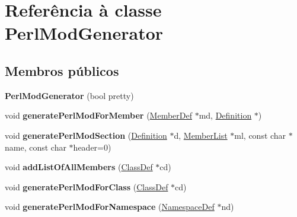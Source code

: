 \hypertarget{class_perl_mod_generator}{\section{Referência à classe Perl\-Mod\-Generator}
\label{class_perl_mod_generator}
}
\subsection*{Membros públicos}
\begin{DoxyCompactItemize}
\item 
\hypertarget{class_perl_mod_generator_a58f771e9e5431d52bbb7ca83eee515ba}{{\bfseries Perl\-Mod\-Generator} (bool pretty)}\label{class_perl_mod_generator_a58f771e9e5431d52bbb7ca83eee515ba}

\item 
\hypertarget{class_perl_mod_generator_a1f071ec8c1a32cbe245ba5117718e077}{void {\bfseries generate\-Perl\-Mod\-For\-Member} (\hyperlink{class_member_def}{Member\-Def} $\ast$md, \hyperlink{class_definition}{Definition} $\ast$)}\label{class_perl_mod_generator_a1f071ec8c1a32cbe245ba5117718e077}

\item 
\hypertarget{class_perl_mod_generator_adcc00d40fff3070fbd69a24cf9fc149b}{void {\bfseries generate\-Perl\-Mod\-Section} (\hyperlink{class_definition}{Definition} $\ast$d, \hyperlink{class_member_list}{Member\-List} $\ast$ml, const char $\ast$name, const char $\ast$header=0)}\label{class_perl_mod_generator_adcc00d40fff3070fbd69a24cf9fc149b}

\item 
\hypertarget{class_perl_mod_generator_a8ccbeac01f2633e926f62a255b08624d}{void {\bfseries add\-List\-Of\-All\-Members} (\hyperlink{class_class_def}{Class\-Def} $\ast$cd)}\label{class_perl_mod_generator_a8ccbeac01f2633e926f62a255b08624d}

\item 
\hypertarget{class_perl_mod_generator_ad5a9d67a70549b46cd7dc8abc9bf95b0}{void {\bfseries generate\-Perl\-Mod\-For\-Class} (\hyperlink{class_class_def}{Class\-Def} $\ast$cd)}\label{class_perl_mod_generator_ad5a9d67a70549b46cd7dc8abc9bf95b0}

\item 
\hypertarget{class_perl_mod_generator_ab826482ec6f6b037004ff5ba1475cd26}{void {\bfseries generate\-Perl\-Mod\-For\-Namespace} (\hyperlink{class_namespace_def}{Namespace\-Def} $\ast$nd)}\label{class_perl_mod_generator_ab826482ec6f6b037004ff5ba1475cd26}


\end{DoxyCompactItemize}
